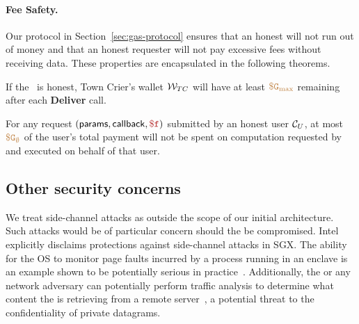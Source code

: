 \paragraph{Fee Safety.}
Our protocol in Section~\ref{sec:gas-protocol} ensures that an honest \tcs will not run out of money
and that an honest requester will not pay excessive fees without receiving data.
These properties are encapsulated in the following theorems.

\begin{theorem}
If the \tc~\medname is honest,
Town Crier's wallet ${\cal W}_{TC}$ will have at least $\tt {\color{brown} \$G_\text{max} }$ remaining after each {\bf Deliver} call.
\end{theorem}


\begin{theorem}
For any request $(\dgform, \dgcallback, \fee)$ submitted by an honest user ${\cal C}_U$,
at most $\tt {\color{brown} \$G_\emptyset }$ of the user's total payment will not be spent on computation requested by and executed on behalf of that user.
\end{theorem}





\subsection{Other security concerns}
We treat side-channel attacks as outside the scope of our initial \tc architecture. Such attacks would be of particular concern should the \medname be compromised. Intel explicitly disclaims protections against side-channel attacks in SGX. The ability for the OS to monitor page faults incurred by a process running in an enclave is an example shown to be potentially serious in practice~\cite{}. Additionally, the \medname or any network adversary can potentially perform traffic analysis to determine what content the \encname is retrieving from a remote server~\cite{}, a potential threat to the confidentiality of private datagrams.


